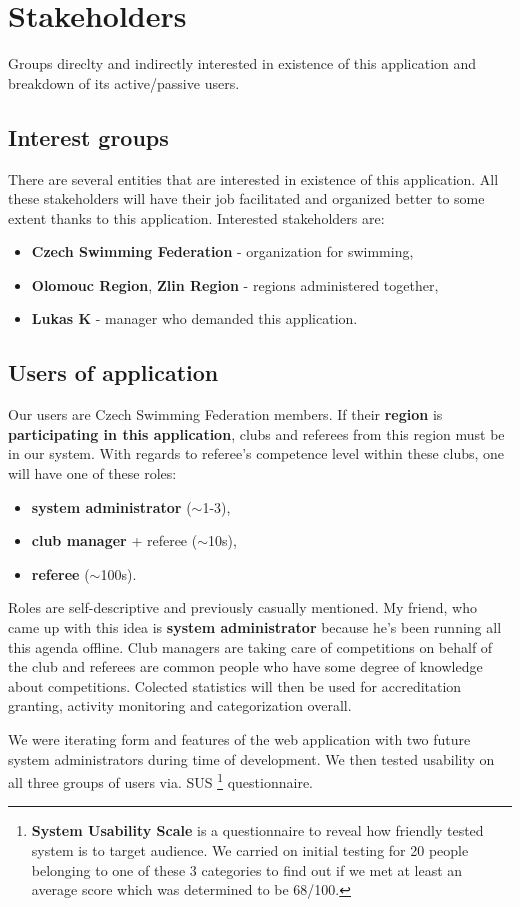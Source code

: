 \section{Stakeholders}
Groups direclty and indirectly interested in existence of this application and breakdown of its active/passive users.
\subsection*{Interest groups}
There are several entities that are interested in existence of this application. All these stakeholders will have their job facilitated and organized better to some extent thanks to this application.  
Interested stakeholders are:
\begin{itemize}
  \item \textbf{Czech Swimming Federation} - organization for swimming,
  \item \textbf{Olomouc Region}, \textbf{Zlin Region} - regions administered together,
  \item \textbf{Lukas K} - manager who demanded this application.
\end{itemize}
\subsection*{Users of application}
Our users are Czech Swimming Federation members. If their \textbf{region} is \textbf{participating in this application}, clubs and referees from this region must be in our system. With regards to referee's competence level within these clubs, one will have one of these roles: 
\begin{itemize}
  \item \textbf{system administrator} ($\sim$1-3),
  \item \textbf{club manager} + referee ($\sim$10s),
  \item \textbf{referee} ($\sim$100s).
\end{itemize} 
Roles are self-descriptive and previously casually mentioned. My friend, who came up with this idea is \textbf{system administrator} because he's been running all this agenda offline. Club managers are taking care of competitions on behalf of the club and referees are common people who have some degree of knowledge about competitions. Colected statistics will then be used for accreditation granting, activity monitoring and categorization overall.
\par
We were iterating form and features of the web application with two future system administrators during time of development. We then tested usability on all three groups of users via. SUS \footnote{\textbf{System Usability Scale} is a questionnaire to reveal how friendly tested system is to target audience. We carried on initial testing for 20 people belonging to one of these 3 categories to find out if we met at least an average score which was determined to be 68/100.} questionnaire.
